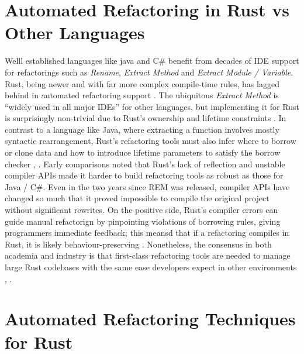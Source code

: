 \section{Automated Refactoring in Rust vs Other Languages}
\label{sec:automated_ref_rust_vs_other}
Welll established languages like java and C\# benefit from decades of IDE
support for refactorings such as \textit{Rename}, \textit{Extract Method} and
\textit{Extract Module / Variable}.
Rust, being newer and with far more complex compile-time rules, has lagged
behind in automated refactoring support \cite{AdventureOfALifetime}. The
ubiquitous \textit{Extract Method} is ``widely used in all major IDEs'' for
other languages, but implementing it for Rust is surprisingly non-trivial due to
Rust's ownership and lifetime constraints \cite{AdventureOfALifetime}. In
contrast to a language like Java, where extracting a function involves mostly
syntactic rearrangement, Rust's refactoring tools must also infer where to
borrow or clone data and how to introduce lifetime parameters to satisfy the
borrow checker \cite{automated_refactoring_of_rust_programs},
\cite{automatically_enforcing_rust_trait_properties}. Early comparisons noted
that Rust's lack of reflection and unstable compiler APIs made it harder to
build refactoring tools as robust as those for Java / C\#. Even in the two years
since REM was released, compiler APIs have changed so much that it proved
impossible to compile the original project without significant rewrites. On the
positive side, Rust's compiler errors can guide manual refactorign by
pinpointing violations of borrowing rules, giving programmers immediate
feedback; this meansd that if a refactoring compiles in Rust, it is likely
behaviour-preserving \cite{Endler_2024}. Nonetheless, the consensus in both
academia and industry is that first-class refactoring tools are needed to manage
large Rust codebases with the same ease developers expect in other environments
\cite{AdventureOfALifetime}, \cite{OneThousandOneStories-SoftwareRefactoring}.
\section{Automated Refactoring Techniques for Rust}
\label{sec:automated_ref_tech_rust}
